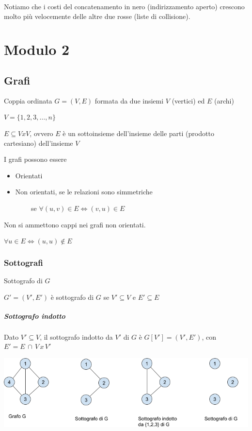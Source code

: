 \documentclass[11pt,a4paper,twoside,openright]{book}
\providecommand{\tightlist}{\setlength{\itemsep}{0pt}\setlength{\parskip}{0pt}}
\let\oldparagraph\paragraph
\renewcommand{\paragraph}[1]{\oldparagraph{#1}\mbox{}}
\begin{document}
{Notiamo che i costi del concatenamento in nero (indirizzamento aperto) crescono molto più velocemente delle altre due rosse (liste di collisione).}

\chapter{Modulo 2}

\section{Grafi}

{Coppia ordinata $G=(V,E)$ formata da due insiemi $V$ (vertici) ed $E$ (archi)}

$V = \{1,2,3,\ldots,n\}$

{$E \subseteq VxV$, ovvero $E$ è un sottoinsieme dell'insieme delle parti (prodotto cartesiano) dell'insieme $V$}

{I grafi possono essere}

\begin{itemize}
\tightlist
\item
  {Orientati}
\item
  {Non orientati, se le relazioni sono simmetriche}
\end{itemize}

{~~~~~~~~se $\forall(u,v) \in E \iff (v,u) \in E$}

{Non si ammettono cappi nei grafi non orientati.}

$\forall u \in E \iff (u,u) \notin E$

\subsection{Sottografi}

{Sottografo di $G$}

{$G'=(V',E')$ è sottografo di $G$ se $V'\subseteq V$ e $E'\subseteq E$}

\paragraph{Sottografo  indotto}

{Dato $V' \subseteq V$, il sottografo indotto da $V'$ di $G$ è $G[V']=(V',E')$, con $E' = E\,\cap\,V\,x\,V'$}

\includegraphics{images/image534.png}
\end{document}
